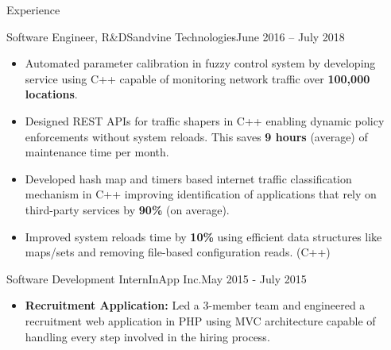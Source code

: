 \documentclass[]{mcdowellcv}
\begin{document}
	\begin{cvsection}{Experience}
		\begin{cvsubsection}{Software Engineer, R\&D}{Sandvine Technologies}{June 2016 -- July 2018}
			\begin{itemize}
				\item Automated parameter calibration in fuzzy control system by developing service using C++ capable of monitoring network traffic over \textbf{100,000 locations}.
				\item Designed REST APIs for traffic shapers in C++ enabling dynamic policy enforcements without system reloads. This saves \textbf{9 hours} (average) of maintenance time per month.
				\item Developed hash map and timers based internet traffic classification mechanism in C++ improving identification of applications that rely on third-party services by \textbf{90\%} (on average).
				\item Improved system reloads time by \textbf{10\%} using efficient data structures like maps/sets and removing file-based configuration reads. (C++)
			\end{itemize}
		\end{cvsubsection}
		
		\begin{cvsubsection}{Software Development Intern}{InApp Inc.}{May 2015 - July 2015}
			\begin{itemize}
				\item \textbf{Recruitment Application:} Led a 3-member team and engineered a recruitment web application in PHP using MVC architecture capable of handling every step involved in the hiring process.
			\end{itemize}
		\end{cvsubsection}
	\end{cvsection}
	
	
	
\end{document}
